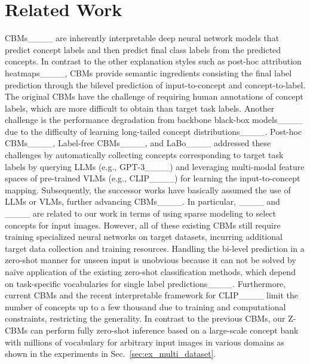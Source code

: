 \section{Related Work}
CBMs____ are inherently interpretable deep neural network models that predict concept labels and then predict final class labels from the predicted concepts.
In contrast to the other explanation styles such as post-hoc attribution heatmaps____, CBMs provide semantic ingredients consisting the final label prediction through the bilevel prediction of input-to-concept and concept-to-label.
The original CBMs have the challenge of requiring human annotations of concept labels, which are more difficult to obtain than target task labels.
Another challenge is the performance degradation from backbone black-box models____ due to the difficulty of learning long-tailed concept distributions____.
Post-hoc CBMs____, Label-free CBMs____, and LaBo____ addressed these challenges by automatically collecting concepts corresponding to target task labels by querying LLMs (e.g., GPT-3____) and leveraging multi-modal feature spaces of pre-trained VLMs (e.g., CLIP____) for learning the input-to-concept mapping.
Subsequently, the successor works have basically assumed the use of LLMs or VLMs, further advancing CBMs____.
In particular, ____ and ____ are related to our work in terms of using sparse modeling to select concepts for input images.
However, all of these existing CBMs still require training specialized neural networks on target datasets, incurring additional target data collection and training resources.
Handling the bi-level prediction in a zero-shot manner for unseen input is unobvious because it can not be solved by na\"ive application of the existing zero-shot classification methods, which depend on task-specific vocabularies for single label predictions____.
Furthermore, current CBMs and the recent interpretable framework for CLIP____ limit the number of concepts up to a few thousand due to training and computational constraints, restricting the generality.
In contrast to the previous CBMs, our Z-CBMs can perform fully zero-shot inference based on a large-scale concept bank with millions of vocabulary for arbitrary input images in various domains as shown in the experiments in Sec.~\ref{sec:ex_multi_dataset}.